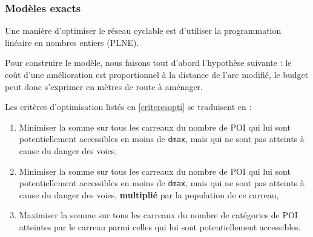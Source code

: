 \subsubsection{Modèles exacts} \label{modelesexacts}

Une manière d'optimiser le réseau cyclable est d'utiliser la programmation linéaire en nombres entiers (PLNE). 

Pour construire le modèle, nous faisons tout d'abord l'hypothèse suivante : le coût d'une amélioration est proportionnel à la distance de l'arc modifié, le budget peut donc s'exprimer en mètres de route à aménager.









Les critères d'optimisation listés en \ref{criteresopti} se traduisent en :

\begin{enumerate}
    \item Minimiser la somme sur tous les carreaux du nombre de POI qui lui sont potentiellement accessibles en moins de \texttt{dmax}, mais qui ne sont pas atteints à cause du danger des voies,
    \item Minimiser la somme sur tous les carreaux du nombre de POI qui lui sont potentiellement accessibles en moins de \texttt{dmax}, mais qui ne sont pas atteints à cause du danger des voies, \textbf{multiplié} par la population de ce carreau,
    \item Maximiser la somme sur tous les carreaux du nombre de catégories de POI atteintes par le carreau parmi celles qui lui sont potentiellement accessibles.
\end{enumerate}

